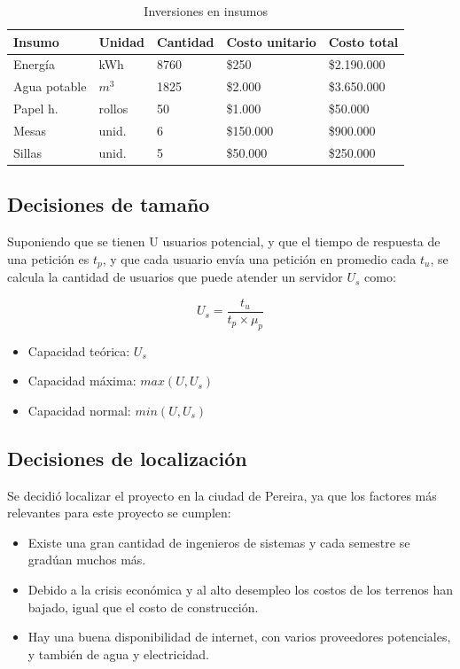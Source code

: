 \documentclass[a4paper, 12pt, oneside]{article}
\begin{document}
	\begin{table}
		\caption{Inversiones en insumos}
		\begin{tabular}{ | p{2.5cm} | p{1.5cm} | p{1.5cm} | p{2cm} | p{2cm} | }
		\hline
		Insumo & Unidad & Cantidad & Costo unitario & Costo total \\
		\hline					
		Energía & kWh & 8760 & \$250 & \$2.190.000 \\
		\hline					
		Agua potable & $m^{3}$ & 1825 & \$2.000 & \$3.650.000 \\
		\hline
		Papel h. & rollos & 50 & \$1.000 & \$50.000 \\
		\hline
		Mesas & unid. & 6 & \$150.000 & \$900.000 \\
		\hline
		Sillas & unid. & 5 & \$50.000 & \$250.000 \\
		\hline
		\end{tabular}
		\label{tb:invInsumos}
	\end{table}
		
	\subsection{Decisiones de tamaño}
	Suponiendo que se tienen U usuarios potencial, y que el tiempo de respuesta de una petición es $t_p$, y que cada usuario envía una petición en promedio cada $t_u$, se calcula la cantidad de usuarios que puede atender un servidor $U_s$ como:
  
	\begin{equation}
	U_s = \frac{t_u}{t_p \times \mu_p} 
	\label{eq:capacidad}
	\end{equation}

	\begin{itemize}
	 \item Capacidad teórica: $U_s$
	 \item Capacidad máxima: $max(U, U_s)$
	 \item Capacidad normal: $min(U, U_s)$
	\end{itemize}
	
	\subsection{Decisiones de localización}
	Se decidió localizar el proyecto en la ciudad de Pereira, ya que los factores más relevantes para este proyecto se cumplen: 

	\begin{itemize}
	 \item Existe una gran cantidad de ingenieros de sistemas y cada semestre se gradúan muchos más.
	 \item Debido a la crisis económica y al alto desempleo los costos de los terrenos han bajado, igual que el costo de construcción.
	 \item Hay una buena disponibilidad de internet, con varios proveedores potenciales, y también de agua y electricidad.
	\end{itemize}
	\clearpage
	
\end{document}

